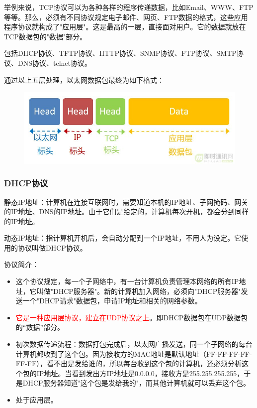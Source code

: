 \documentclass[UTF8]{article}%
\begin{document}
举例来说，TCP协议可以为各种各样的程序传递数据，比如Email、WWW、FTP等等。那么，必须有不同协议规定电子邮件、网页、FTP数据的格式，这些应用程序协议就构成了"应用层"。这是最高的一层，直接面对用户。它的数据就放在TCP数据包的"数据"部分。

包括DHCP协议、TFTP协议、HTTP协议、SNMP协议、FTP协议、SMTP协议、DNS协议、telnet协议。

通过以上五层处理，以太网数据包最终为如下格式：

\begin{figure}[htb!]%
    \includegraphics[width=1.0\textwidth]{1.9-1}
    \label{fig::3}
\end{figure} 

\subsubsection{DHCP协议}

静态IP地址：计算机在连接互联网时，需要知道本机的IP地址、子网掩码、网关的IP地址、DNS的IP地址。由于它们是给定的，计算机每次开机，都会分到同样的IP地址。

动态IP地址：指计算机开机后，会自动分配到一个IP地址，不用人为设定。它使用的协议叫做DHCP协议。

协议简介：

\begin{itemize}
    \item 这个协议规定，每一个子网络中，有一台计算机负责管理本网络的所有IP地址，它叫做"DHCP服务器"。新的计算机加入网络，必须向"DHCP服务器"发送一个"DHCP请求"数据包，申请IP地址和相关的网络参数。
    \item \textcolor{red}{它是一种应用层协议，建立在UDP协议之上}。即DHCP数据包在UDP数据包的“数据”部分。
    \item 初次数据传递流程：数据打包完成后，以太网广播发送，同一个子网络的每台计算机都收到了这个包。因为接收方的MAC地址是默认地址（FF-FF-FF-FF-FF-FF），看不出是发给谁的，所以每台收到这个包的计算机，还必须分析这个包的IP地址。当看到发出方IP地址是0.0.0.0，接收方是255.255.255.255，于是DHCP服务器知道"这个包是发给我的"，而其他计算机就可以丢弃这个包。
    \item 处于应用层。
\end{itemize}
\end{document}
